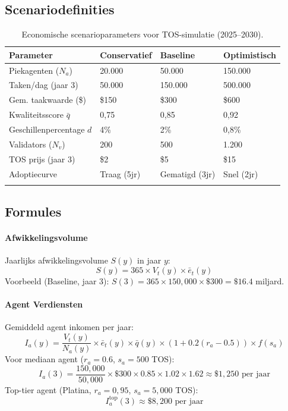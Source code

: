 \documentclass[11pt]{article}
\begin{document}
\subsection{Scenariodefinities}
\begin{longtable}{@{}p{}p{}p{}p{}@{}}
\toprule
\textbf{Parameter} & \textbf{Conservatief} & \textbf{Baseline} & \textbf{Optimistisch} \\\midrule
Piekagenten ($N_a$) & 20.000 & 50.000 & 150.000 \\
Taken/dag (jaar 3) & 50.000 & 150.000 & 500.000 \\
Gem. taakwaarde (\$) & \$150 & \$300 & \$600 \\
Kwaliteitsscore $\bar{q}$ & 0,75 & 0,85 & 0,92 \\
Geschillenpercentage $d$ & 4\% & 2\% & 0,8\% \\
Validators ($N_v$) & 200 & 500 & 1.200 \\
TOS prijs (jaar 3) & \$2 & \$5 & \$15 \\
Adoptiecurve & Traag (5jr) & Gematigd (3jr) & Snel (2jr) \\\bottomrule
\caption{Economische scenarioparameters voor TOS-simulatie (2025--2030).}
\label{tab:econ-scenarios}
\end{longtable}

\subsection{Formules}
\paragraph{Afwikkelingsvolume} Jaarlijks afwikkelingsvolume $S(y)$ in jaar $y$:
\begin{equation}
S(y) = 365 \times V_t(y) \times \bar{e}_t(y)
\end{equation}
Voorbeeld (Baseline, jaar 3): $S(3) = 365 \times 150{,}000 \times \$300 = \$16.4$ miljard.

\paragraph{Agent Verdiensten} Gemiddeld agent inkomen per jaar:
\begin{equation}
I_a(y) = \frac{V_t(y)}{N_a(y)} \times \bar{e}_t(y) \times \bar{q}(y) \times (1 + 0.2(r_a - 0.5)) \times f(s_a)
\end{equation}
Voor mediaan agent ($r_a = 0.6$, $s_a = 500$ TOS):
\begin{equation}
I_a(3) = \frac{150{,}000}{50{,}000} \times \$300 \times 0.85 \times 1.02 \times 1.62 \approx \$1{,}250 \text{ per jaar}
\end{equation}
Top-tier agent (Platina, $r_a = 0,95$, $s_a = 5{,}000$ TOS):
\begin{equation}
I_a^{\text{top}}(3) \approx \$8{,}200 \text{ per jaar}
\end{equation}
\end{document}
